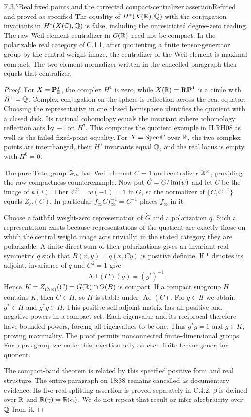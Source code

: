 \begin{result}{F.3.7}{Real fixed points and the corrected compact-centralizer assertion}{Refuted and proved as specified}
The equality of $H^*(X(\mathbb R),\mathbb Q)$ with the conjugation invariants in $H^*(X(\mathbb C),\mathbb Q)$ is false, including the unrestricted degree-zero reading. The raw Weil-element centralizer in $G(\mathbb R)$ need not be compact. In the polarizable real category of C.1.1, after quotienting a finite tensor-generator group by the central weight image, the centralizer of the Weil element is maximal compact. The two-element normalizer written in the cancelled paragraph then equals that centralizer.
\end{result}
\begin{proof}
For $X=\mathbf P^1_\mathbb R$, the complex $H^1$ is zero, while $X(\mathbb R)=\mathbf{RP}^1$ is a circle with $H^1=\mathbb Q$. Complex conjugation on the sphere is reflection across the real equator. Choosing the representative in one closed hemisphere identifies the quotient with a closed disk. Its rational cohomology equals the invariant sphere cohomology: reflection acts by $-1$ on $H^2$. This computes the quotient example in II.RH08 as well as the failed fixed-point equality. For $X=\operatorname{Spec}\mathbb C$ over $\mathbb R$, the two complex points are interchanged, their $H^0$ invariants equal $\mathbb Q$, and the real locus is empty with $H^0=0$.

The pure Tate group $\mathbb G_m$ has Weil element $C=1$ and centralizer $\mathbb R^\times$, providing the raw compactness counterexample. Now put $\dot G=G/\operatorname{im}(w)$ and let $C$ be the image of $h(i)$. Then $C^2=w(-1)=1$ in $\dot G$, so the normalizer of $\{C,C^{-1}\}$ equals $Z_{\dot G}(C)$. In particular $f_\infty C f_\infty^{-1}=C^{-1}$ places $f_\infty$ in it.

Choose a faithful weight-zero representation of $\dot G$ and a polarization $q$. Such a representation exists because representations of the quotient are exactly those on which the central weight image acts trivially; in the stated category they are polarizable. A finite direct sum of their polarizations gives an invariant real symmetric $q$ such that $B(x,y)=q(x,Cy)$ is positive definite. If $*$ denotes its adjoint, invariance of $q$ and $C^2=1$ give
\[
 \operatorname{Ad}(C)(g)=(g^*)^{-1}.
\]
Hence $K=Z_{\dot G(\mathbb R)}(C)=\dot G(\mathbb R)\cap O(B)$ is compact. If a compact subgroup $H$ contains $K$, then $C\in H$, so $H$ is stable under $\operatorname{Ad}(C)$. For $g\in H$ we obtain $g^*\in H$ and $g^*g\in H$. This positive self-adjoint matrix has all positive and negative powers in a compact set. Each eigenvalue and its reciprocal therefore have bounded powers, forcing all eigenvalues to be one. Thus $g^*g=1$ and $g\in K$, proving maximality. The proof permits nonconnected finite-dimensional groups. For a pro-group we make this assertion only on each finite tensor-generator quotient.

The compact-band theorem \cite[Theorem 4.17(a)]{DM1982} is related by this specified positive form and real structure. The entire paragraph on 18:38 remains cancelled as documentary evidence. Its live real-splitting assertion is proved separately in C.4.2: $\beta$ is defined over $\mathbb R$ and $\mathbb R(\gamma)=\mathbb R(\alpha)$. We do not repeat that result or infer algebraicity over $\overline{\mathbb Q}$ from it.
\end{proof}
